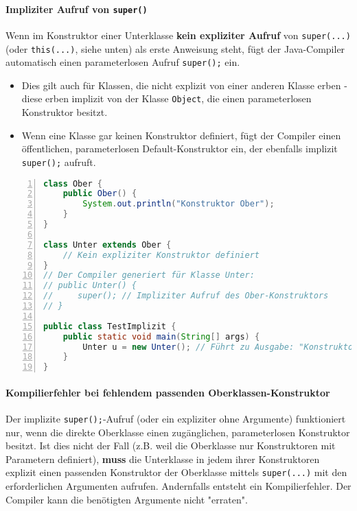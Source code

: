 \paragraph{Impliziter Aufruf von \texttt{super()}}
Wenn im Konstruktor einer Unterklasse \textbf{kein expliziter Aufruf} von \texttt{super(...)} (oder \texttt{this(...)}, siehe unten) 
als erste Anweisung steht, fügt der Java-Compiler automatisch einen parameterlosen Aufruf \texttt{super();} ein.
\begin{itemize}
    \item Dies gilt auch für Klassen, die nicht explizit von einer anderen Klasse erben - diese erben implizit von der 
    Klasse \texttt{Object}, die einen parameterlosen Konstruktor besitzt.
    \item Wenn eine Klasse gar keinen Konstruktor definiert, fügt der Compiler einen öffentlichen, parameterlosen Default-Konstruktor 
    ein, der ebenfalls implizit \texttt{super();} aufruft.
\end{itemize}

\begin{lstlisting}[language=Java, caption={Impliziter Konstruktor und \texttt{super()}-Aufruf durch den Compiler}, label=lst:implizit_super, 
    basicstyle=\ttfamily\footnotesize, breaklines=true, frame=tb, numbers=left]
class Ober {
    public Ober() {
        System.out.println("Konstruktor Ober");
    }
}

class Unter extends Ober {
    // Kein expliziter Konstruktor definiert
}
// Der Compiler generiert für Klasse Unter:
// public Unter() {
//     super(); // Impliziter Aufruf des Ober-Konstruktors
// }

public class TestImplizit {
    public static void main(String[] args) {
        Unter u = new Unter(); // Führt zu Ausgabe: "Konstruktor Ober"
    }
}
\end{lstlisting}

\paragraph{Kompilierfehler bei fehlendem passenden Oberklassen-Konstruktor}
Der implizite \texttt{super();}-Aufruf (oder ein expliziter ohne Argumente) funktioniert nur, wenn die direkte Oberklasse einen 
zugänglichen, parameterlosen Konstruktor besitzt. Ist dies nicht der Fall (z.B. weil die Oberklasse nur Konstruktoren mit Parametern definiert), 
\textbf{muss} die Unterklasse in jedem ihrer Konstruktoren explizit einen passenden Konstruktor der Oberklasse mittels \texttt{super(...)} mit 
den erforderlichen Argumenten aufrufen. Andernfalls entsteht ein Kompilierfehler. Der Compiler kann die benötigten Argumente nicht "erraten".

